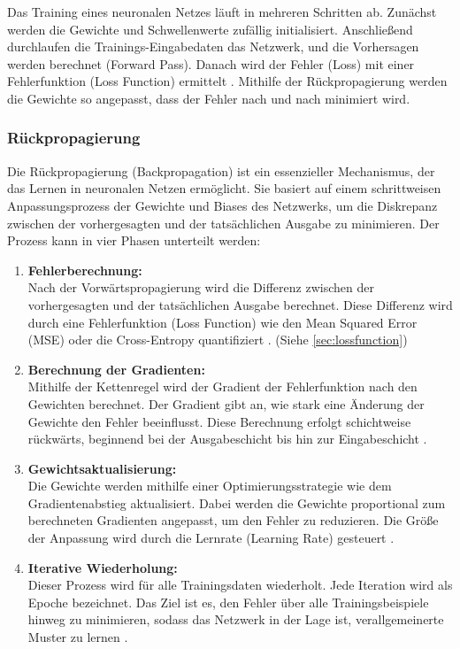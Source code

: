 
Das Training eines neuronalen Netzes läuft in mehreren Schritten ab. Zunächst werden die Gewichte und Schwellenwerte zufällig initialisiert. Anschließend durchlaufen die Trainings-Eingabedaten das Netzwerk, und die Vorhersagen werden berechnet (Forward Pass). Danach wird der Fehler (Loss) mit einer Fehlerfunktion (Loss Function) ermittelt \cite{Goodfellow2016}. Mithilfe der Rückpropagierung werden die Gewichte so angepasst, dass der Fehler nach und nach minimiert wird.

\subsubsection{Rückpropagierung}
Die Rückpropagierung (Backpropagation) ist ein essenzieller Mechanismus, der das Lernen in neuronalen Netzen ermöglicht. Sie basiert auf einem schrittweisen Anpassungsprozess der Gewichte und Biases des Netzwerks, um die Diskrepanz zwischen der vorhergesagten und der tatsächlichen Ausgabe zu minimieren. Der Prozess kann in vier Phasen unterteilt werden:

\begin{enumerate}
    \item \textbf{Fehlerberechnung:} \\
    Nach der Vorwärtspropagierung wird die Differenz zwischen der vorhergesagten und der tatsächlichen Ausgabe berechnet. Diese Differenz wird durch eine Fehlerfunktion (Loss Function) wie den Mean Squared Error (MSE) oder die Cross-Entropy quantifiziert \cite{Goodfellow2016, Schmidhuber2015}. (Siehe \ref{sec:lossfunction})

    \item \textbf{Berechnung der Gradienten:} \\
    Mithilfe der Kettenregel wird der Gradient der Fehlerfunktion nach den Gewichten berechnet. Der Gradient gibt an, wie stark eine Änderung der Gewichte den Fehler beeinflusst. Diese Berechnung erfolgt schichtweise rückwärts, beginnend bei der Ausgabeschicht bis hin zur Eingabeschicht \cite{Rumelhart1986}.
    
    \item \textbf{Gewichtsaktualisierung:} \\
    Die Gewichte werden mithilfe einer Optimierungsstrategie wie dem Gradientenabstieg aktualisiert. Dabei werden die Gewichte proportional zum berechneten Gradienten angepasst, um den Fehler zu reduzieren. Die Größe der Anpassung wird durch die Lernrate (Learning Rate) gesteuert \cite{Kingma2015}.
    
    \item \textbf{Iterative Wiederholung:} \\
    Dieser Prozess wird für alle Trainingsdaten wiederholt. Jede Iteration wird als Epoche bezeichnet. Das Ziel ist es, den Fehler über alle Trainingsbeispiele hinweg zu minimieren, sodass das Netzwerk in der Lage ist, verallgemeinerte Muster zu lernen \cite{nielsen2015neural}.
\end{enumerate}

